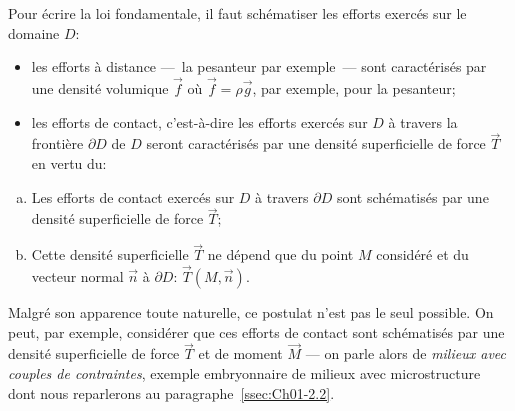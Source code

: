Pour écrire la loi fondamentale, il faut schématiser les efforts exercés sur le domaine $D$:
\begin{itemize}
    \item les efforts à distance ---~la pesanteur par exemple~--- sont caractérisés par une densité volumique $\vec{f}$ où $\vec{f}=\rho \vec{g}$, par exemple, pour la pesanteur;
    \item les efforts de contact, c'est-à-dire les efforts exercés sur $D$ à travers la frontière $\partial D$ de $D$ seront caractérisés par une densité superficielle de force $\vec{T}$ en vertu du:
\end{itemize}

\begin{Postulat}
    \begin{enumerate}[(a)]
        \item Les efforts de contact exercés sur $D$ à travers $\partial D$ sont schématisés par une densité superficielle de force $\vec{T}$;
        \item Cette densité superficielle $\vec{T}$ ne dépend que du point $M$ considéré et du vecteur normal $\vec{n}$ à $\partial D$: $\vec{T}(M,\vec{n})$.
    \end{enumerate}
\end{Postulat}

Malgré son apparence toute naturelle, ce postulat n'est pas le seul possible.
On peut, par exemple, considérer que ces efforts de contact sont schématisés par une densité superficielle de force $\vec{T}$ et de moment $\vec{M}$ --- on parle alors de \emph{milieux avec couples de contraintes}, exemple embryonnaire de milieux avec microstructure dont nous reparlerons au paragraphe~\ref{ssec:Ch01-2.2}.

